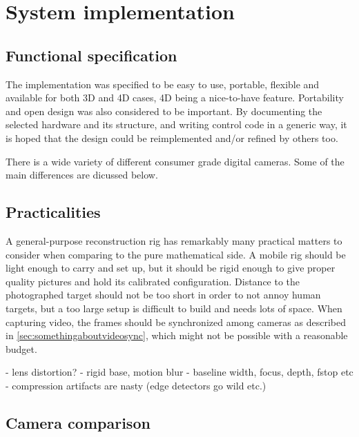 \section{System implementation}

\subsection{Functional specification} %

The implementation was specified to be easy to use, portable, flexible and available for both 3D and 4D cases, 4D being a nice-to-have feature.
Portability and open design was also considered to be important.
By documenting the selected hardware and its structure, and writing control code in a generic way, it is hoped that the design could be reimplemented and/or refined by others too.

There is a wide variety of different consumer grade digital cameras.
Some of the main differences are dicussed below.


\subsection{Practicalities} %

A general-purpose reconstruction rig has remarkably many practical matters to consider when comparing to the pure mathematical side.
A mobile rig should be light enough to carry and set up, but it should be rigid enough to give proper quality pictures and hold its calibrated configuration.
Distance to the photographed target should not be too short in order to not annoy human targets, but a too large setup is difficult to build and needs lots of space.
When capturing video, the frames should be synchronized among cameras as described in \ref{sec:somethingaboutvideosync}, which might not be possible with a reasonable budget.


- lens distortion?
- rigid base, motion blur
- baseline width, focus, depth, fstop etc
- compression artifacts are nasty (edge detectors go wild etc.)


\subsection{Camera comparison} %

